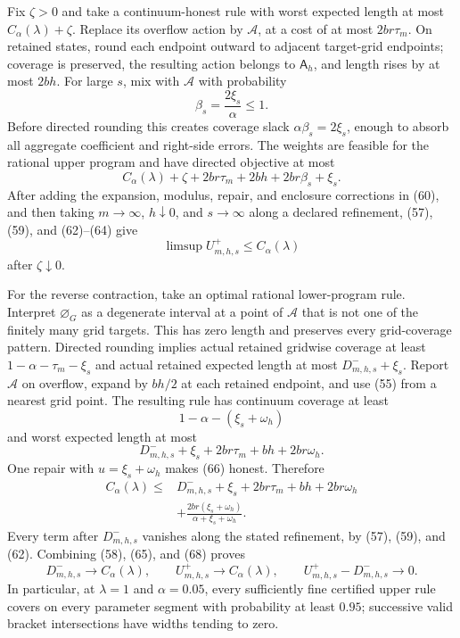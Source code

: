 Fix \(\zeta>0\) and take a continuum-honest rule with worst expected
length at most \(C_\alpha(\lambda)+\zeta\).  Replace its overflow action
by \(\mathcal A\), at a cost of at most \(2br\tau_m\).  On retained
states, round each endpoint outward to adjacent target-grid endpoints;
coverage is preserved, the resulting action belongs to
\(\mathsf A_h\), and length rises by at most \(2bh\).  For large \(s\),
mix with \(\mathcal A\) with probability
\[
 \beta_s=\frac{2\xi_s}{\alpha}\le1.
 \tag{63}
\]
Before directed rounding this creates coverage slack
\(\alpha\beta_s=2\xi_s\), enough to absorb all aggregate coefficient
and right-side errors.  The weights are feasible for the rational upper
program and have directed objective at most
\[
 C_\alpha(\lambda)+\zeta+2br\tau_m+2bh
 +2br\beta_s+\xi_s.
 \tag{64}
\]
After adding the expansion, modulus, repair, and enclosure corrections
in (60), and then taking \(m\to\infty\), \(h\downarrow0\), and
\(s\to\infty\) along a declared refinement, (57), (59), and
(62)--(64) give
\[
 \limsup U_{m,h,s}^+\le C_\alpha(\lambda)
 \tag{65}
\]
after \(\zeta\downarrow0\).

For the reverse contraction, take an optimal rational lower-program
rule.  Interpret \(\varnothing_G\) as a degenerate interval at a point
of \(\mathcal A\) that is not one of the finitely many grid targets.
This has zero length and preserves every grid-coverage pattern.
Directed rounding implies actual retained gridwise coverage at least
\(1-\alpha-\tau_m-\xi_s\) and actual retained expected length at most
\(D_{m,h,s}^-+\xi_s\).  Report \(\mathcal A\) on overflow, expand by
\(bh/2\) at each retained endpoint, and use (55) from a nearest grid
point.  The resulting rule has continuum coverage at least
\[
 1-\alpha-(\xi_s+\omega_h)
 \tag{66}
\]
and worst expected length at most
\[
 D_{m,h,s}^-+\xi_s+2br\tau_m+bh+2br\omega_h.
 \tag{67}
\]
One repair with \(u=\xi_s+\omega_h\) makes (66) honest.  Therefore
\[
\begin{aligned}
 C_\alpha(\lambda)
 \le{}&D_{m,h,s}^-+\xi_s+2br\tau_m+bh+2br\omega_h\\
 &+\frac{2br(\xi_s+\omega_h)}
 {\alpha+\xi_s+\omega_h}.
\end{aligned}
\tag{68}
\]
Every term after \(D_{m,h,s}^-\) vanishes along the stated refinement,
by (57), (59), and (62).  Combining (58), (65), and (68) proves
\[
 D_{m,h,s}^-\to C_\alpha(\lambda),\qquad
 U_{m,h,s}^+\to C_\alpha(\lambda),\qquad
 U_{m,h,s}^+-D_{m,h,s}^-\to0.
 \tag{69}
\]
In particular, at \(\lambda=1\) and \(\alpha=0.05\), every sufficiently
fine certified upper rule covers on every parameter segment with
probability at least \(0.95\); successive valid bracket intersections
have widths tending to zero.

